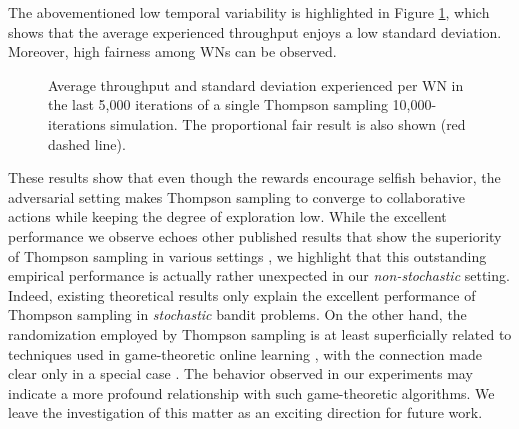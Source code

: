 \documentclass[10pt,journal,compsoc]{IEEEtran}
\begin{document}
	
	The abovementioned low temporal variability is highlighted in Figure \ref{fig:ts_avg_individual}, which shows that the average experienced throughput enjoys a low standard deviation. Moreover, high fairness among WNs can be observed.
	\begin{figure}[h!]
		\centering							
		\caption{Average throughput and standard deviation experienced per WN in the last 5,000 iterations of a single Thompson sampling 10,000-iterations simulation. The proportional fair result is also shown (red dashed line).}
		\label{fig:ts_avg_individual}
	\end{figure}
	
	These results show that even though the rewards encourage selfish behavior, the adversarial setting makes Thompson sampling to converge to collaborative actions while keeping the degree of exploration low. While the excellent performance we observe echoes other published results that show the superiority of Thompson sampling in various settings \cite{LCLS10}, we highlight that this outstanding empirical performance is actually rather unexpected in our \emph{non-stochastic} setting. Indeed, existing theoretical results only explain the excellent performance of Thompson sampling in \emph{stochastic} bandit problems. On the other hand, the randomization employed by Thompson sampling is at least superficially related to techniques used in game-theoretic online learning \cite{FS97,CBLu06:book}, with the connection made clear only in a special case \cite{Gop13}. The behavior observed in our experiments may indicate a more profound relationship with such game-theoretic algorithms. We leave the investigation of this matter as an exciting direction for future work.
	
\end{document}
